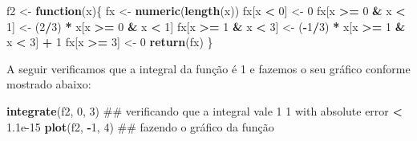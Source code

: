 \documentclass[10pt,a4paper]{book}
\newenvironment{Shaded}{\begin{snugshade}}{\end{snugshade}}
\newcommand{\KeywordTok}[1]{\textcolor[rgb]{0.13,0.29,0.53}{\textbf{#1}}}
\newcommand{\DecValTok}[1]{\textcolor[rgb]{0.00,0.00,0.81}{#1}}
\newcommand{\FloatTok}[1]{\textcolor[rgb]{0.00,0.00,0.81}{#1}}
\newcommand{\StringTok}[1]{\textcolor[rgb]{0.31,0.60,0.02}{#1}}
\newcommand{\ControlFlowTok}[1]{\textcolor[rgb]{0.13,0.29,0.53}{\textbf{#1}}}
\newcommand{\OperatorTok}[1]{\textcolor[rgb]{0.81,0.36,0.00}{\textbf{#1}}}
\newcommand{\NormalTok}[1]{#1}
\begin{document}
\begin{Shaded}
\begin{Highlighting}[]
\NormalTok{f2 <-}\StringTok{ }\ControlFlowTok{function}\NormalTok{(x)\{}
\NormalTok{  fx <-}\StringTok{ }\KeywordTok{numeric}\NormalTok{(}\KeywordTok{length}\NormalTok{(x))}
\NormalTok{  fx[x }\OperatorTok{<}\StringTok{ }\DecValTok{0}\NormalTok{] <-}\StringTok{ }\DecValTok{0}
\NormalTok{  fx[x }\OperatorTok{>=}\StringTok{ }\DecValTok{0} \OperatorTok{&}\StringTok{ }\NormalTok{x }\OperatorTok{<}\StringTok{ }\DecValTok{1}\NormalTok{] <-}\StringTok{ }\NormalTok{(}\DecValTok{2}\OperatorTok{/}\DecValTok{3}\NormalTok{) }\OperatorTok{*}\StringTok{ }\NormalTok{x[x }\OperatorTok{>=}\StringTok{ }\DecValTok{0} \OperatorTok{&}\StringTok{ }\NormalTok{x }\OperatorTok{<}\StringTok{ }\DecValTok{1}\NormalTok{]}
\NormalTok{  fx[x }\OperatorTok{>=}\StringTok{ }\DecValTok{1} \OperatorTok{&}\StringTok{ }\NormalTok{x }\OperatorTok{<}\StringTok{ }\DecValTok{3}\NormalTok{] <-}\StringTok{ }\NormalTok{(}\OperatorTok{-}\DecValTok{1}\OperatorTok{/}\DecValTok{3}\NormalTok{) }\OperatorTok{*}\StringTok{ }\NormalTok{x[x }\OperatorTok{>=}\StringTok{ }\DecValTok{1} \OperatorTok{&}\StringTok{ }\NormalTok{x }\OperatorTok{<}\StringTok{ }\DecValTok{3}\NormalTok{] }\OperatorTok{+}\StringTok{ }\DecValTok{1}
\NormalTok{  fx[x }\OperatorTok{>=}\StringTok{ }\DecValTok{3}\NormalTok{] <-}\StringTok{ }\DecValTok{0}
  \KeywordTok{return}\NormalTok{(fx)}
\NormalTok{\}}
\end{Highlighting}
\end{Shaded}

A seguir verificamos que a integral da função é 1 e fazemos o seu
gráfico conforme mostrado abaixo:

\begin{Shaded}
\begin{Highlighting}[]
\KeywordTok{integrate}\NormalTok{(f2, }\DecValTok{0}\NormalTok{, }\DecValTok{3}\NormalTok{) ## verificando que a integral vale 1}
\DecValTok{1}\NormalTok{ with absolute error }\OperatorTok{<}\StringTok{ }\FloatTok{1.1e-15}
\KeywordTok{plot}\NormalTok{(f2, }\OperatorTok{-}\DecValTok{1}\NormalTok{, }\DecValTok{4}\NormalTok{)     ## fazendo o gráfico da função}
\end{Highlighting}
\end{Shaded}
\end{document}
